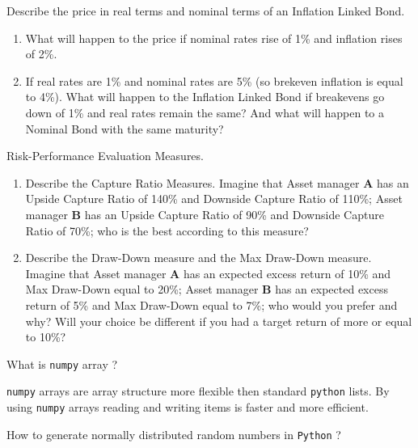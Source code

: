 \documentclass[12pt,a4paper]{exam}
\begin{document}
\begin{questions}
\question Describe the price in real terms and nominal terms of an Inflation Linked Bond.
\begin{enumerate}
\item What will happen to the price if nominal rates rise of 1\% and inflation rises of 2\%.
\item If real rates are 1\% and nominal rates are 5\% (so brekeven inflation is equal to 4\%). What will happen to the Inflation Linked Bond if breakevens go down of 1\% and real rates remain the same? And what will happen to a Nominal Bond with the same maturity?

\end{enumerate}
\fillwithlines{3cm}
\begin{solution}
\end{solution}

\question Risk-Performance Evaluation Measures.
\begin{enumerate}
\item Describe the Capture Ratio Measures. Imagine that Asset manager \textbf{A} has an Upside Capture Ratio of 140\% and Downside Capture Ratio of 110\%; Asset manager \textbf{B} has an Upside Capture Ratio of 90\% and Downside Capture Ratio of 70\%; who is the best according to this measure?
\item Describe the Draw-Down measure and the Max Draw-Down measure. Imagine that Asset manager \textbf{A} has an expected excess return of 10\% and Max Draw-Down equal to 20\%; Asset manager \textbf{B} has an expected excess return of 5\% and Max Draw-Down equal to 7\%; who would you prefer and why? Will your choice be different if you had a target return of more or equal to 10\%?

\end{enumerate}
\fillwithlines{3cm}
\begin{solution}
\end{solution}

\question What is \texttt{numpy} array ?
\fillwithlines{3cm}
\begin{solution}
\texttt{numpy} arrays are array structure more flexible then standard \texttt{python} lists. By using \texttt{numpy} arrays reading and writing items is faster and more efficient.
\end{solution}

\question How to generate normally distributed random numbers in \texttt{Python} ?
\makeemptybox{3cm}


\end{questions}
\end{document}
